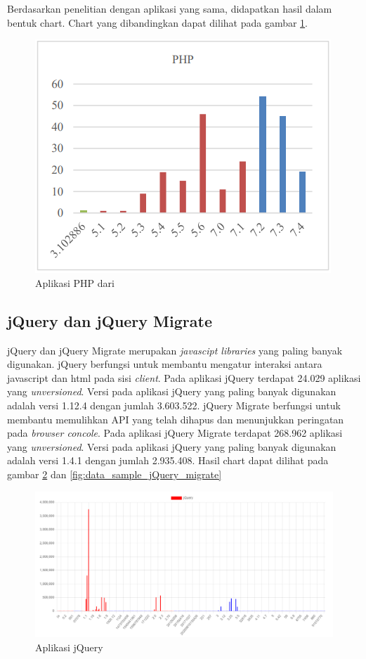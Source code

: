 Berdasarkan penelitian dengan aplikasi yang sama, didapatkan hasil dalam bentuk chart. Chart yang dibandingkan dapat dilihat pada gambar \ref{fig:data_sample_php_p}.

\begin{figure}[H]
	\centering  
	\includegraphics[scale=0.7]{Gambar/chart_pascal_php.PNG}  
	\caption{Aplikasi PHP dari \cite{pascal}} 
	\label{fig:data_sample_php_p} 
\end{figure}

\subsection{jQuery dan jQuery Migrate}
jQuery dan jQuery Migrate merupakan \textit{javascipt libraries} yang paling banyak digunakan. jQuery berfungsi untuk membantu mengatur interaksi antara javascript dan html pada sisi \textit{client}. Pada aplikasi jQuery terdapat 24.029 aplikasi yang \textit{unversioned}. Versi pada aplikasi jQuery yang paling banyak digunakan adalah versi 1.12.4 dengan jumlah 3.603.522. jQuery Migrate berfungsi untuk membantu memulihkan API yang telah dihapus dan menunjukkan peringatan pada \textit{browser concole}. Pada aplikasi jQuery Migrate terdapat 268.962 aplikasi yang \textit{unversioned}. Versi pada aplikasi jQuery yang paling banyak digunakan adalah versi 1.4.1 dengan jumlah 2.935.408. Hasil chart dapat dilihat pada gambar \ref{fig:data_sample_jQuery} dan  \ref{fig:data_sample_jQuery_migrate}
\begin{figure}[H]
	\centering  
	\includegraphics[scale=0.4]{Gambar/data_sample_jQuery.png}  
	\caption{Aplikasi jQuery} 
	\label{fig:data_sample_jQuery} 
\end{figure}

